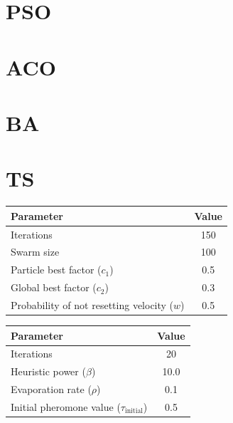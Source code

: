 \documentclass[paper=a4, fontsize=9pt]{scrartcl}
\begin{document}
\begin{multicols}{2}
\section*{\acl{PSO}}


\section*{\acl{ACO}}


\section*{\acl{BA}}


\section*{\acl{TS}}




{
\begin{minipage}{\linewidth{}}
\centering
\begin{tabular}{lc}
\toprule
Parameter                                   & Value \\
\midrule
Iterations                                  & 150   \\
Swarm size                                  & 100   \\
Particle best factor ($c_1$)                &   0.5 \\
Global best factor ($c_2$)                  &   0.3 \\
Probability of not resetting velocity ($w$) &   0.5 \\
\bottomrule
\end{tabular}
\label{table:psoparams}
\end{minipage}
}

{
\begin{minipage}{\linewidth{}}
\centering
\begin{tabular}{lc}
\toprule
Parameter                                         & Value \\
\midrule
Iterations                                        & 20    \\
Heuristic power ($\beta$)                         & 10.0  \\
Evaporation rate ($\rho$)                         &  0.1  \\
Initial pheromone value ($\tau_{\text{initial}}$) &  0.5  \\
\bottomrule
\end{tabular}
\label{table:acoparams}
\end{minipage}
}


\end{multicols}
\end{document}
